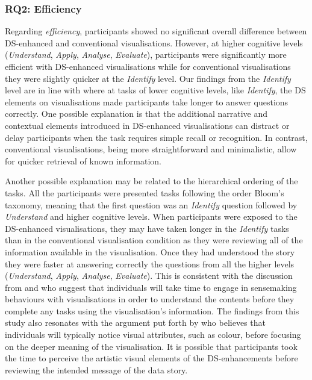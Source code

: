 \subsubsection{RQ2: Efficiency} Regarding \textit{efficiency}, participants showed no significant overall difference between DS-enhanced and conventional visualisations. However, at higher cognitive levels (\textit{Understand}, \textit{Apply}, \textit{Analyse}, \textit{Evaluate}), participants were significantly more efficient with DS-enhanced visualisations while for conventional visualisations they were slightly quicker at the \textit{Identify} level. Our findings from the \textit{Identify} level are in line with \citet{shao2024datastorytelling} where at tasks of lower cognitive levels, like \textit{Identify}, the DS elements on visualisations made participants take longer to answer questions correctly. One possible explanation is that the additional narrative and contextual elements introduced in DS-enhanced visualisations can distract or delay participants when the task requires simple recall or recognition. In contrast, conventional visualisations, being more straightforward and minimalistic, allow for quicker retrieval of known information. 

Another possible explanation may be related to the hierarchical ordering of the tasks. All the participants were presented tasks following the order Bloom's taxonomy, meaning that the first question was an \textit{Identify} question followed by \textit{Understand} and higher cognitive levels. When participants were exposed to the DS-enhanced visualisations, they may have taken longer in the \textit{Identify} tasks than in the conventional visualisation condition as they were reviewing all of the information available in the visualisation. Once they had understood the story they were faster at answering correctly the questions from all the higher levels (\textit{Understand}, \textit{Apply}, \textit{Analyse}, \textit{Evaluate}). This is consistent with the discussion from \citet{liu2020survey} and \citet{galati2021} who suggest that individuals will take time to engage in sensemaking behaviours with visualisations in order to understand the contents before they complete any tasks using the visualisation's information. The findings from this study also resonates with the argument put forth by \citet{ryan2016visual} who believes that individuals will typically notice visual attributes, such as colour, before focusing on the deeper meaning of the visualisation. It is possible that participants took the time to perceive the artistic visual elements of the DS-enhancements before reviewing the intended message of the data story.

